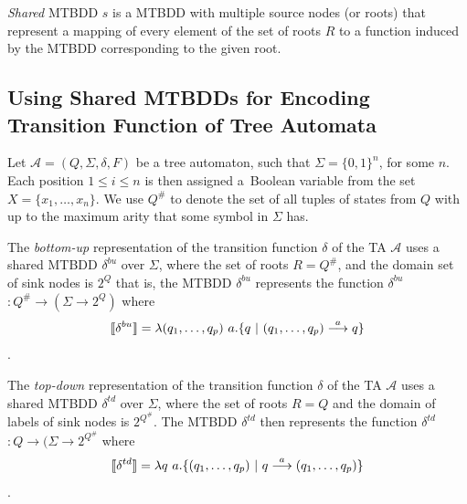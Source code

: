 \emph{Shared} MTBDD $s$ is a MTBDD with multiple source nodes (or roots) that
represent a mapping of every element of the set of roots $R$ to a function
induced by the MTBDD corresponding to the given root.

\subsection[Usage of MTBDDs with TA]{Using Shared MTBDDs for Encoding
Transition Function of Tree Automata} Let $\mathcal{A} = (Q, \Sigma, \delta, F)$
be a tree automaton, such that $\Sigma = \{0, 1\}^n$, for some $n$. Each
position $1 \leq i \leq n$ is then assigned a~Boolean variable from the set $X =
\{x_1,\ldots,x_n\}$. We use $Q^\#$ to denote the set of all tuples of states from $Q$ with up to the
maximum arity that some symbol in $\Sigma$ has.

The \emph{bottom-up} representation of the transition function $\delta$ of the
TA $\mathcal{A}$ uses a shared MTBDD $\delta^{bu}$ over $\Sigma$, where the set
of roots $R = Q^\#$, and the domain set of sink nodes is $2^Q$ that is, the
MTBDD $\delta^{bu}$ represents the function \textlbrackdbl $\delta^{bu}$
\textrbrackdbl $: Q^\# \rightarrow (\Sigma \rightarrow 2^Q)$ where
 \begin{equation}
  \text{\textlbrackdbl} \delta^{bu} \text{\textrbrackdbl} =
 \lambda (q_1,\ldots,q_p)\ a . \{q\ |\ (q_1,\ldots,q_p)
 \overset{a}{\longrightarrow} q\} \end{equation}.

The \emph{top-down} representation of the transition function $\delta$ of the TA
$\mathcal{A}$ uses a shared MTBDD $\delta^{td}$ over $\Sigma$, where the set of
roots $R = Q$ and the domain of labels of sink nodes is $2^{Q^\#}$. The MTBDD
$\delta^{td}$ then represents the function \textlbrackdbl $\delta^{td}$
\textrbrackdbl $: Q \rightarrow (\Sigma \rightarrow 2^{Q^\#}$ where
\begin{equation} \text{\textlbrackdbl} \delta^{td} \text{\textrbrackdbl} =
\lambda q\ a .
\{(q_1,\ldots,q_p)\ |\ q \overset{a}{\longrightarrow} (q_1,\ldots,q_p)\}
\end{equation}.

